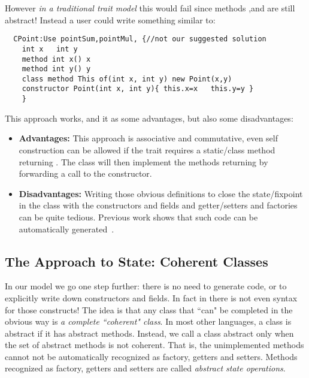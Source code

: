 \noindent However \emph{in a traditional trait model} this would fail since methods \Q@x@,\Q@y@ and \Q@of@ are still abstract!
Instead a user could write something similar to:

\begin{lstlisting}
  CPoint:Use pointSum,pointMul, {//not our suggested solution
    int x   int y
    method int x() x       
    method int y() y
    class method This of(int x, int y) new Point(x,y)
    constructor Point(int x, int y){ this.x=x   this.y=y }
    }
\end{lstlisting}

\noindent This approach works, and it as some advantages, but also
some disadvantages: 

\begin{itemize}

\item {\bf Advantages:} This approach is associative and commutative, even self construction
  can be allowed if the trait requires a static/class method
  returning \Q@This@. The class will then implement the methods returning \Q@This@
  by forwarding a call to the constructor.
  
\item {\bf Disadvantages:} Writing those obvious definitions to close
  the state/fixpoint in the class 
   with the constructors and fields and getter/setters and factories can be quite tedious.
   Previous work shows that such code can be automatically generated~\cite{wang2016classless}.

\end{itemize}

\subsection{The \name Approach to State: Coherent Classes}

In our model we go one step further: there is no need to generate
code, or to explicitly write down constructors and fields. In fact in
\name there is not even syntax for those constructs!  The idea is that
any class that ``can" be completed in the obvious way  is \emph{a
  complete ``coherent" class}.  In most other languages, a class is
abstract if it has abstract methods.  Instead, we call a class
abstract only when the set of abstract methods is not coherent. That
is, the unimplemented methods cannot not be automatically recognized
as factory, getters and setters. Methods recognized as factory, getters and setters are called
\emph{abstract state operations}.
  
